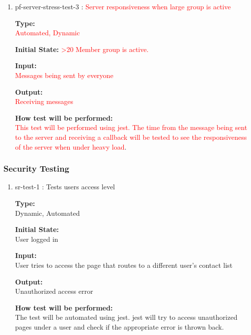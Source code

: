 \documentclass[12pt, titlepage]{article}
\begin{document}
\begin{enumerate}
\item{pf-server-stress-test-3 : \textcolor{red}{Server responsiveness when large group is active\\}}

\textbf{Type:}\\ \textcolor{red}{Automated, Dynamic}
					
\textbf{Initial State:} \textcolor{red}{>20 Member group is active.}
					
\textbf{Input:}\\ \textcolor{red}{Messages being sent by everyone}
					
\textbf{Output:}\\ \textcolor{red}{Receiving messages}
					
\textbf{How test will be performed:}\\ 
\textcolor{red}{ This test will be performed using jest. The time from the message being sent to the server and receiving a callback will be tested to see the responsiveness of the server when under heavy load}.
\end{enumerate}

\subsubsection{Security Testing}
\begin{enumerate}
\item{sr-test-1 : Tests users access level\\}

\textbf{Type:}\\ Dynamic, Automated
					
\textbf{Initial State:}\\ User logged in
					
\textbf{Input:}\\ User tries to access the page that routes to a different user's contact list
					
\textbf{Output:}\\ Unauthorized access error
					
\textbf{How test will be performed:}\\ 
The test will be automated using jest. jest will try to access unauthorized pages under a user and check if the appropriate error is thrown back.
\end{enumerate}
\end{document}
